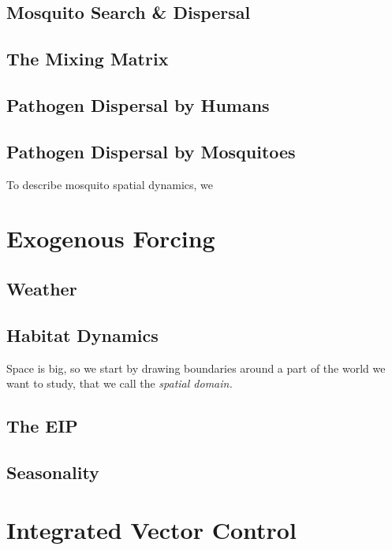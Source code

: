 \documentclass[
]{book}
\begin{document}
\subsection{Mosquito Search \& Dispersal}\label{mosquito-search-dispersal}

\subsection{The Mixing Matrix}\label{the-mixing-matrix}

\subsection{Pathogen Dispersal by Humans}\label{pathogen-dispersal-by-humans}

\subsection{Pathogen Dispersal by Mosquitoes}\label{pathogen-dispersal-by-mosquitoes}

To describe mosquito spatial dynamics, we

\section{Exogenous Forcing}\label{exogenous-forcing-1}

\subsection{Weather}\label{weather}

\subsection{Habitat Dynamics}\label{habitat-dynamics}

Space is big, so we start by drawing boundaries around a part of the world we want to study, that we call the \emph{spatial domain.}

\subsection{The EIP}\label{the-eip}

\subsection{Seasonality}\label{seasonality}

\section{Integrated Vector Control}\label{integrated-vector-control}
\end{document}
